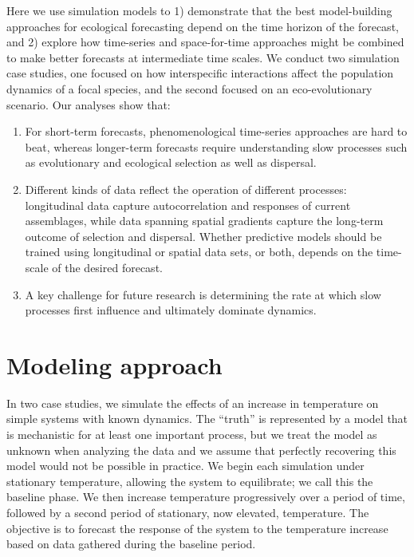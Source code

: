\documentclass[11pt]{article}
\begin{document}
Here we use simulation models to 1) demonstrate that the best model-building approaches for ecological forecasting 
depend on the time horizon of the forecast, and 2) explore how time-series and space-for-time approaches might be 
combined to make better forecasts at intermediate time scales. We conduct two simulation case studies, one 
focused on how interspecific interactions affect the population dynamics of a focal species, and the second focused on
an eco-evolutionary scenario. Our analyses show that: 
\begin{enumerate}
	\item For short-term forecasts, phenomenological time-series approaches are hard to beat, whereas longer-term forecasts require understanding slow processes such as evolutionary and ecological selection as well as dispersal.
	\item Different kinds of data reflect the operation of different processes: longitudinal data capture autocorrelation and responses of current assemblages, while data spanning spatial gradients capture the long-term outcome of selection and dispersal.  Whether predictive models should be trained using longitudinal or spatial data sets, or both, depends on the time-scale of the desired forecast.
	\item A key challenge for future research is determining the rate at which slow processes first influence and ultimately dominate dynamics.
\end{enumerate}

\section*{Modeling approach}

In two case studies, we simulate the effects of an increase in temperature on simple systems with known dynamics.
The ``truth'' is represented by a model that is mechanistic for at least one important process, but we treat the model as unknown when
analyzing the data and we assume that perfectly recovering this model would not be possible in practice. We begin each simulation
under stationary temperature, allowing the system to equilibrate; we call this the baseline phase. 
We then increase temperature progressively over a period of time, followed by a second period of stationary, now elevated, temperature. 
The objective is to forecast the response of the system to the temperature increase based on data gathered during the baseline period. 
\end{document}
